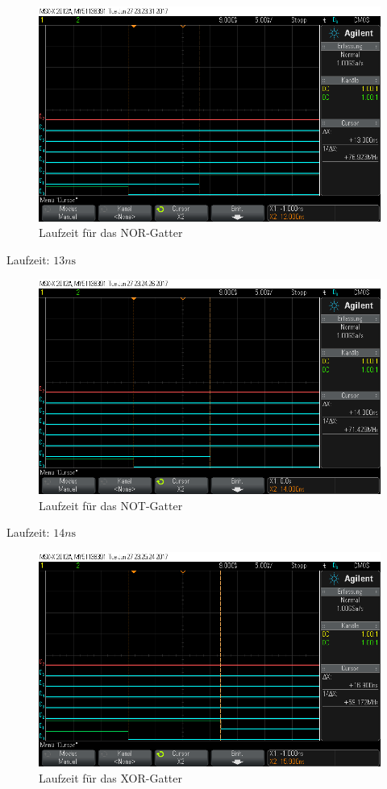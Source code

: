 \documentclass[10pt]{scrreprt}
\begin{document}
    \begin{figure}[H]
        \includegraphics[width=\textwidth]{scope_9.png}
        \caption{Laufzeit für das NOR-Gatter}
    \end{figure}

    Laufzeit: $13\si{n\second}$

    \begin{figure}[H]
        \includegraphics[width=\textwidth]{scope_10.png}
        \caption{Laufzeit für das NOT-Gatter}
    \end{figure}

    Laufzeit: $14\si{n\second}$

    \begin{figure}[H]
        \includegraphics[width=\textwidth]{scope_11.png}
        \caption{Laufzeit für das XOR-Gatter}
    \end{figure}
\end{document}
